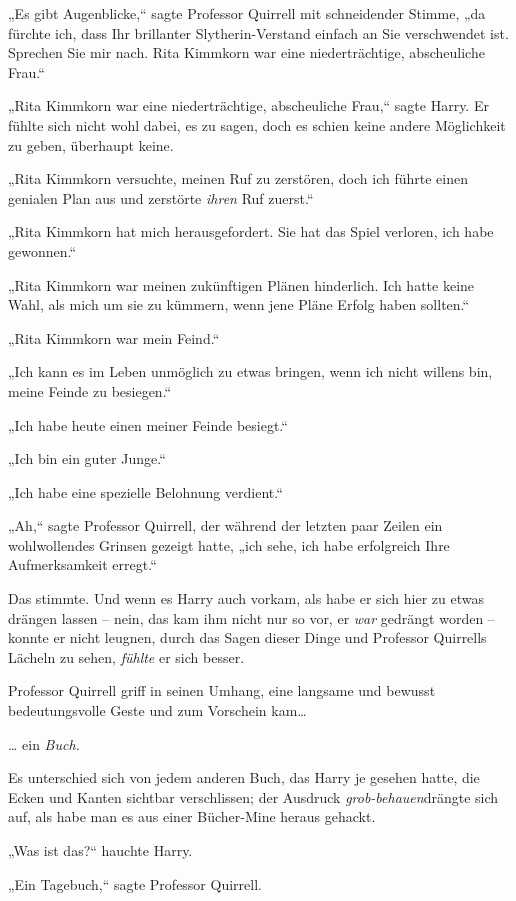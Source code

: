 {„Es gibt Augenblicke,“ sagte Professor Quirrell mit schneidender Stimme, „da fürchte ich, dass Ihr brillanter Slytherin-Verstand einfach an Sie verschwendet ist. Sprechen Sie mir nach. Rita Kimmkorn war eine niederträchtige, abscheuliche Frau.“

„Rita Kimmkorn war eine niederträchtige, abscheuliche Frau,“ sagte Harry. Er fühlte sich nicht wohl dabei, es zu sagen, doch es schien keine andere Möglichkeit zu geben, überhaupt keine.

„Rita Kimmkorn versuchte, meinen Ruf zu zerstören, doch ich führte einen genialen Plan aus und zerstörte \emph{ihren} Ruf zuerst.“

„Rita Kimmkorn hat mich herausgefordert. Sie hat das Spiel verloren, ich habe gewonnen.“

„Rita Kimmkorn war meinen zukünftigen Plänen hinderlich. Ich hatte keine Wahl, als mich um sie zu kümmern, wenn jene Pläne Erfolg haben sollten.“

„Rita Kimmkorn war mein Feind.“

„Ich kann es im Leben unmöglich zu etwas bringen, wenn ich nicht willens bin, meine Feinde zu besiegen.“

„Ich habe heute einen meiner Feinde besiegt.“

„Ich bin ein guter Junge.“

„Ich habe eine spezielle Belohnung verdient.“

„Ah,“ sagte Professor Quirrell, der während der letzten paar Zeilen ein wohlwollendes Grinsen gezeigt hatte, „ich sehe, ich habe erfolgreich Ihre Aufmerksamkeit erregt.“

Das stimmte. Und wenn es Harry auch vorkam, als habe er sich hier zu etwas drängen lassen -- nein, das kam ihm nicht nur so vor, er \emph{war} gedrängt worden -- konnte er nicht leugnen, durch das Sagen dieser Dinge und Professor Quirrells Lächeln zu sehen, \emph{fühlte} er sich besser.

Professor Quirrell griff in seinen Umhang, eine langsame und bewusst bedeutungsvolle Geste und zum Vorschein kam…

… ein \emph{Buch.}

Es unterschied sich von jedem anderen Buch, das Harry je gesehen hatte, die Ecken und Kanten sichtbar verschlissen; der Ausdruck \emph{grob-behauen}drängte sich auf, als habe man es aus einer Bücher-Mine heraus gehackt.

„Was ist das?“ hauchte Harry.

„Ein Tagebuch,“ sagte Professor Quirrell.

}

